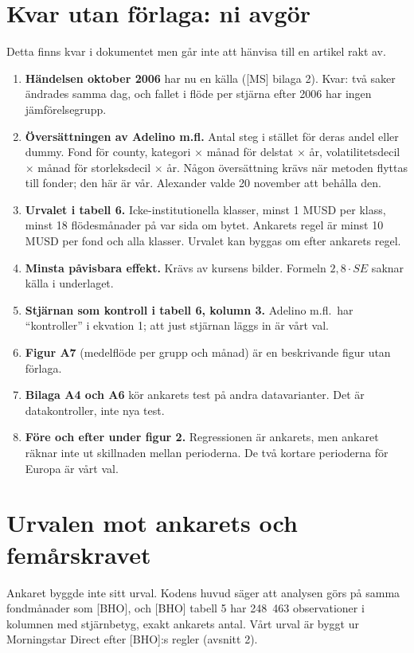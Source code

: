 \documentclass[10pt,a4paper]{article}
\begin{document}
\section{Kvar utan förlaga: ni avgör}
Detta finns kvar i dokumentet men går inte att hänvisa till en artikel rakt av.
\begin{enumerate}[leftmargin=*,itemsep=1pt]
\item \textbf{Händelsen oktober 2006} har nu en källa ([MS] bilaga 2). Kvar: två saker ändrades samma dag, och fallet i flöde per stjärna efter 2006 har ingen jämförelsegrupp.
\item \textbf{Översättningen av Adelino m.fl.} Antal steg i stället för deras andel eller dummy. Fond för county, kategori $\times$ månad för delstat $\times$ år, volatilitetsdecil $\times$ månad för storleksdecil $\times$ år. Någon översättning krävs när metoden flyttas till fonder; den här är vår. Alexander valde 20 november att behålla den.
\item \textbf{Urvalet i tabell 6.} Icke-institutionella klasser, minst 1 MUSD per klass, minst 18 flödesmånader på var sida om bytet. Ankarets regel är minst 10 MUSD per fond och alla klasser. Urvalet kan byggas om efter ankarets regel.
\item \textbf{Minsta påvisbara effekt.} Krävs av kursens bilder. Formeln $2{,}8\cdot SE$ saknar källa i underlaget.
\item \textbf{Stjärnan som kontroll i tabell 6, kolumn 3.} Adelino m.fl.\ har ``kontroller'' i ekvation 1; att just stjärnan läggs in är vårt val.
\item \textbf{Figur A7} (medelflöde per grupp och månad) är en beskrivande figur utan förlaga.
\item \textbf{Bilaga A4 och A6} kör ankarets test på andra datavarianter. Det är datakontroller, inte nya test.
\item \textbf{Före och efter under figur 2.} Regressionen är ankarets, men ankaret räknar inte ut skillnaden mellan perioderna. De två kortare perioderna för Europa är vårt val.
\end{enumerate}

\section{Urvalen mot ankarets och femårskravet}
Ankaret byggde inte sitt urval. Kodens huvud säger att analysen görs på samma fondmånader som [BHO], och [BHO] tabell 5 har 248~463 observationer i kolumnen med stjärnbetyg, exakt ankarets antal. Vårt urval är byggt ur Morningstar Direct efter [BHO]:s regler (avsnitt 2).
\end{document}
